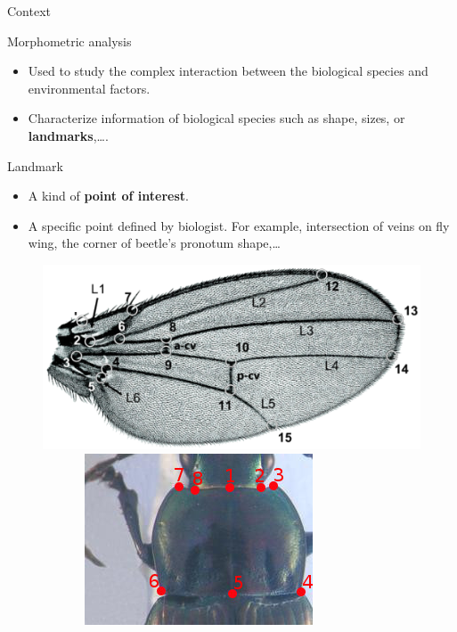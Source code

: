 \documentclass[10pt,svgnames]{beamer}
\begin{document}
\begin{frame}[t]{Context}
\begin{block}{Morphometric analysis}
  \begin{itemize}    
    \item Used to study the complex interaction between the biological species and environmental factors.
    \item Characterize information of biological species such as shape, sizes, or \textbf{landmarks},\ldots.
  \end{itemize}
  \end{block}

  \begin{block}{Landmark}
  \begin{itemize}
     \item A kind of \textbf{point of interest}.
     \item A specific point defined by biologist. For example, intersection of veins on fly wing, the corner of beetle's pronotum shape,\ldots
  \end{itemize}
  	\begin{figure}[htbp]
       \centering
       \includegraphics[scale=.17]{images/wing}~~~~~~
       \includegraphics[scale=.3]{images/pronotum_lm}~~
	\end{figure}
  \end{block}
\end{frame}
\end{document}
